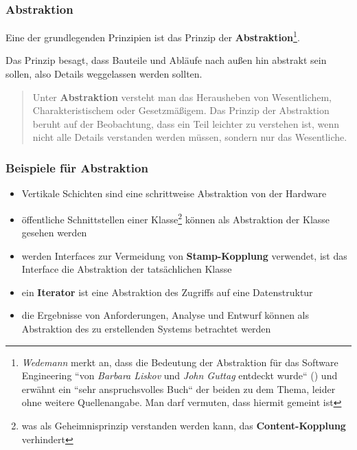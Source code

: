 \subsubsection*{Abstraktion}
Eine der grundlegenden Prinzipien ist das Prinzip der \textbf{Abstraktion}\footnote{
\textit{Wedemann} merkt an, dass die Bedeutung der Abstraktion für das Software Engineering ``von \textit{Barbara Liskov} und \textit{John Guttag} entdeckt wurde`` (\cite[75, Hervorhebung eigene]{Wed09b}) und erwähnt ein ``sehr anspruchsvolles Buch`` der beiden zu dem Thema, leider ohne weitere Quellenangabe. Man darf vermuten, dass hiermit \cite{LG00} gemeint ist
}.

\noindent
Das Prinzip besagt, dass Bauteile und Abläufe nach außen hin abstrakt sein sollen, also Details weggelassen werden sollten.

\vspace{2mm}
\begin{tcolorbox}[title=Abstraktion]
    \blockquote[{\cite[75, Hervorhebung eigene]{Wed09b}}]{
        Unter \textbf{Abstraktion} versteht man das Herausheben von Wesentlichem, Charakteristischem oder Gesetzmäßigem. Das Prinzip der Abstraktion beruht auf der Beobachtung, dass ein Teil leichter zu verstehen ist, wenn nicht alle Details verstanden werden müssen, sondern nur das Wesentliche.
    }
\end{tcolorbox}
\vspace{2mm}

\subsubsection*{Beispiele für Abstraktion}
\begin{itemize}
    \item Vertikale Schichten sind eine schrittweise Abstraktion von der Hardware
    \item öffentliche Schnittstellen einer Klasse\footnote{
        was als Geheimnisprinzip verstanden werden kann, das \textbf{Content-Kopplung} verhindert
    } können als Abstraktion der Klasse gesehen werden
    \item werden Interfaces zur Vermeidung von \textbf{Stamp-Kopplung} verwendet, ist das Interface die Abstraktion der tatsächlichen Klasse
    \item ein \textbf{Iterator} ist eine Abstraktion des Zugriffs auf eine Datenstruktur
    \item die Ergebnisse von Anforderungen, Analyse und Entwurf können als Abstraktion des zu erstellenden Systems betrachtet werden
\end{itemize}


